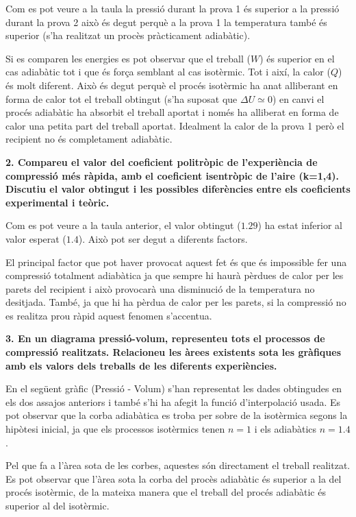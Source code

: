 \documentclass[a4paper]{article}
\begin{document}
Com es pot veure a la taula la pressió durant la prova 1 és superior a la pressió durant la prova 2 això és degut perquè a la prova 1 la temperatura també és superior (s'ha realitzat un procès pràcticament adiabàtic). 

Si es comparen les energies es pot observar que el treball ($W$) és superior en el cas adiabàtic tot i que és força semblant al cas isotèrmic. Tot i així, la calor ($Q$) és molt diferent. Això és degut perquè el procés isotèrmic ha anat alliberant en forma de calor tot el treball obtingut (s'ha suposat que $\Delta U \simeq 0$) en canvi el procés adiabàtic ha absorbit el treball aportat i només ha alliberat en forma de calor una petita part del treball aportat. Idealment la calor de la prova 1 però el recipient no és completament adiabàtic.

\textbf{2. Compareu el valor del coeficient politròpic de l’experiència de compressió més ràpida, amb el coeficient isentròpic de l’aire (k=1,4). Discutiu el valor obtingut i les possibles diferències entre els coeficients experimental i teòric.}

Com es pot veure a la taula anterior, el valor obtingut ($1.29$) ha estat inferior al valor esperat ($1.4$). Això pot ser degut a diferents factors.

El principal factor que pot haver provocat aquest fet és que és impossible fer una compressió totalment adiabàtica ja que sempre hi haurà pèrdues de calor per les parets del recipient i això provocarà una disminució de la temperatura no desitjada. També, ja que hi ha pèrdua de calor per les parets, si la compressió no es realitza prou ràpid aquest fenomen s'accentua.

\textbf{3. En un diagrama pressió-volum, representeu tots el processos de compressió realitzats. Relacioneu les àrees existents sota les gràfiques amb els valors dels treballs de les diferents experiències.}

En el següent gràfic (Pressió - Volum) s'han representat les dades obtingudes en els dos assajos anteriors i també s'hi ha afegit la funció d'interpolació usada. Es pot observar que la corba adiabàtica es troba per sobre de la isotèrmica segons la hipòtesi inicial, ja que els processos isotèrmics tenen $n=1$ i els adiabàtics $n=1.4$. 

Pel que fa a l'àrea sota de les corbes, aquestes són directament el treball realitzat. Es pot observar que l'àrea sota la corba del procès adiabàtic és superior a la del procés isotèrmic, de la mateixa manera que el treball del procés adiabàtic és superior al del isotèrmic.
\end{document}
